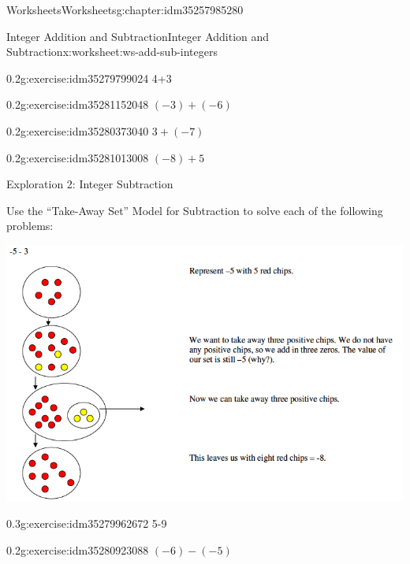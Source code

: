 \documentclass[twoside,11pt,]{book}
\begin{document}
\begin{chapterptx}{Worksheets}{}{Worksheets}{}{}{g:chapter:idm35257985280}
\begin{worksheet-section-numberless}{Integer Addition and Subtraction}{}{Integer Addition and Subtraction}{}{}{x:worksheet:ws-add-sub-integers}
\begin{introduction}{}
\begin{sidebyside}{1}{0}{0}{0}
\end{sidebyside}%
%
\end{introduction}%
\begin{divisionexercise}{1}{}{0.2}{g:exercise:idm35279799024}%
4+3%
\end{divisionexercise}%
\clearpage
\begin{divisionexercise}{2}{}{0.2}{g:exercise:idm35281152048}%
\((-3)+(-6) \)%
\end{divisionexercise}%
\begin{divisionexercise}{3}{}{0.2}{g:exercise:idm35280373040}%
\(3+(-7) \)%
\end{divisionexercise}%
\begin{divisionexercise}{4}{}{0.2}{g:exercise:idm35281013008}%
\((-8)+ 5 \)%
\end{divisionexercise}%
\clearpage
\begin{introduction}{}%
Exploration 2: Integer Subtraction%
\par
Use the ``Take-Away Set'' Model for Subtraction to solve each of the following problems: \begin{sidebyside}{1}{0}{0}{0}%
\begin{sbspanel}{1}%
\includegraphics[width=1\linewidth]{images/integer-sub-model.png}
\end{sbspanel}%
\end{sidebyside}%
%
\end{introduction}%
\begin{divisionexercise}{5}{}{0.3}{g:exercise:idm35279962672}%
5-9%
\end{divisionexercise}%
\clearpage
\begin{divisionexercise}{6}{}{0.2}{g:exercise:idm35280923088}%
\((-6)-(-5) \)%
\end{divisionexercise}%

\end{worksheet-section-numberless}
\end{chapterptx}
\end{document}
